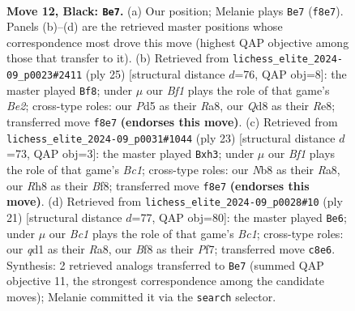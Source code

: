 \documentclass[11pt]{article}
\begin{document}
\clearpage

\begin{figure}[p]\centering
\begin{subfigure}{0.46\textwidth}\centering
\resizebox{\linewidth}{!}{%
\newchessgame
\chessboard[
  setfen={rnbqkb1r/ppp5/1n3pp1/3p2Np/P2P4/NB6/1PP2PPP/R1BQR1K1 b kq - 1 12},
  showmover=false,
  pgfstyle=straightmove, color=movearrow, markmove={f8-e7}
]}
\caption{}
\end{subfigure}\hfill
\begin{subfigure}{0.46\textwidth}\centering
\resizebox{\linewidth}{!}{%
\newchessgame
\chessboard[
  setfen={r1b1r1k1/ppq1bpp1/2np1n1p/8/P2NP3/3BB2P/1P1N1PP1/R2QR1K1 b - - 0 13},
  showmover=false,
  pgfstyle=straightmove, color=movearrow, markmove={e7-f8}
]}
\caption{}
\end{subfigure}
\\[4pt]
\begin{subfigure}{0.46\textwidth}\centering
\resizebox{\linewidth}{!}{%
\newchessgame
\chessboard[
  setfen={r1b1kb1r/p4pp1/2n2n1p/2qp4/8/2NQP2N/PP3PPP/R1B1KB1R b KQkq - 0 12},
  showmover=false,
  pgfstyle=straightmove, color=movearrow, markmove={c8-h3}
]}
\caption{}
\end{subfigure}\hfill
\begin{subfigure}{0.46\textwidth}\centering
\resizebox{\linewidth}{!}{%
\newchessgame
\chessboard[
  setfen={r1bqk2r/1p3ppp/p2b1n2/3p4/P2p4/2N5/BPPP1PPP/R1BQR1K1 b kq - 1 11},
  showmover=false,
  pgfstyle=straightmove, color=movearrow, markmove={c8-e6}
]}
\caption{}
\end{subfigure}
\caption{\textbf{Move 12, Black: \texttt{Be7}.} (a) Our position; Melanie plays \texttt{Be7} (\texttt{f8e7}). Panels (b)--(d) are the retrieved master positions whose correspondence most drove this move (highest QAP objective among those that transfer to it). (b) Retrieved from \texttt{lichess\_elite\_2024-09\_p0023\#2411} (ply 25) [structural distance $d$=76, QAP obj=8]: the master played \texttt{Bf8}; under $\mu$ our \emph{Bf1} plays the role of that game's \emph{Be2}; cross-type roles: our \emph{P}d5 as their \emph{R}a8, our \emph{Q}d8 as their \emph{R}e8; transferred move \texttt{f8e7} \textbf{(endorses this move)}. (c) Retrieved from \texttt{lichess\_elite\_2024-09\_p0031\#1044} (ply 23) [structural distance $d$=73, QAP obj=3]: the master played \texttt{Bxh3}; under $\mu$ our \emph{Bf1} plays the role of that game's \emph{Bc1}; cross-type roles: our \emph{N}b8 as their \emph{R}a8, our \emph{R}h8 as their \emph{B}f8; transferred move \texttt{f8e7} \textbf{(endorses this move)}. (d) Retrieved from \texttt{lichess\_elite\_2024-09\_p0028\#10} (ply 21) [structural distance $d$=77, QAP obj=80]: the master played \texttt{Be6}; under $\mu$ our \emph{Bc1} plays the role of that game's \emph{Bc1}; cross-type roles: our \emph{q}d1 as their \emph{R}a8, our \emph{B}f8 as their \emph{P}f7; transferred move \texttt{c8e6}. Synthesis: 2 retrieved analogs transferred to \texttt{Be7} (summed QAP objective 11, the strongest correspondence among the candidate moves); Melanie committed it via the \texttt{search} selector.}
\label{fig:thought-m23}
\end{figure}
\end{document}
